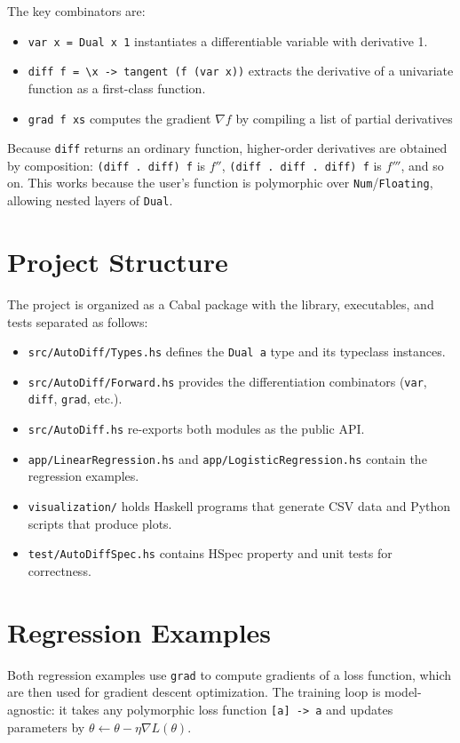 \documentclass{article}
\begin{document}
The key combinators are:
\begin{itemize}
  \item \texttt{var x = Dual x 1} instantiates a differentiable variable with derivative 1.
  \item \texttt{diff f = \textbackslash x -> tangent (f (var x))} extracts the derivative of a univariate function as a first-class function.
  \item \texttt{grad f xs} computes the gradient $\nabla f$ by compiling a list of partial derivatives
\end{itemize}
Because \texttt{diff} returns an ordinary function, higher-order derivatives are obtained by composition: \texttt{(diff . diff) f} is $f''$, \texttt{(diff . diff . diff) f} is $f'''$, and so on. This works because the user's function is polymorphic over \texttt{Num}/\texttt{Floating}, allowing nested layers of \texttt{Dual}.

\section{Project Structure}

The project is organized as a Cabal package with the library, executables, and tests separated as follows:
\begin{itemize}
  \item \texttt{src/AutoDiff/Types.hs} defines the \texttt{Dual a} type and its typeclass instances.
  \item \texttt{src/AutoDiff/Forward.hs} provides the differentiation combinators (\texttt{var}, \texttt{diff}, \texttt{grad}, etc.).
  \item \texttt{src/AutoDiff.hs} re-exports both modules as the public API.
  \item \texttt{app/LinearRegression.hs} and \texttt{app/LogisticRegression.hs} contain the regression examples.
  \item \texttt{visualization/} holds Haskell programs that generate CSV data and Python scripts that produce plots.
  \item \texttt{test/AutoDiffSpec.hs} contains HSpec property and unit tests for correctness.
\end{itemize}

\section{Regression Examples}

Both regression examples use \texttt{grad} to compute gradients of a loss function, which are then used for gradient descent optimization. The training loop is model-agnostic: it takes any polymorphic loss function \texttt{[a] -> a} and updates parameters by $\theta \leftarrow \theta - \eta \nabla L(\theta)$.
\end{document}

